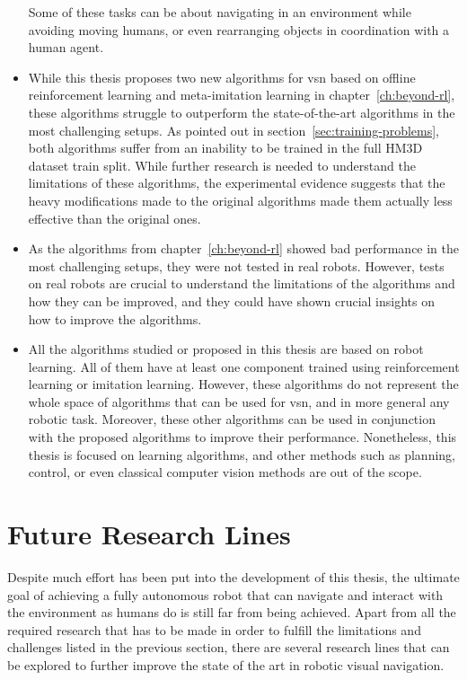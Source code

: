 \begin{itemize}
    Some of these tasks can be about navigating in an environment while avoiding moving humans, or even rearranging objects in coordination with a human agent.
    \item While this thesis proposes two new algorithms for \acrshort{vsn} based on offline reinforcement learning and meta-imitation learning in chapter~\ref{ch:beyond-rl}, these algorithms struggle to outperform the state-of-the-art algorithms in the most challenging setups.
    As pointed out in section~\ref{sec:training-problems}, both algorithms suffer from an inability to be trained in the full HM3D dataset train split.
    While further research is needed to understand the limitations of these algorithms, the experimental evidence suggests that the heavy modifications made to the original algorithms made them actually less effective than the original ones.
    \item As the algorithms from chapter~\ref{ch:beyond-rl} showed bad performance in the most challenging setups, they were not tested in real robots.
    However, tests on real robots are crucial to understand the limitations of the algorithms and how they can be improved, and they could have shown crucial insights on how to improve the algorithms.
    \item All the algorithms studied or proposed in this thesis are based on robot learning.
    All of them have at least one component trained using reinforcement learning or imitation learning.
    However, these algorithms do not represent the whole space of algorithms that can be used for \acrshort{vsn}, and in more general any robotic task.
    Moreover, these other algorithms can be used in conjunction with the proposed algorithms to improve their performance.
    Nonetheless, this thesis is focused on learning algorithms, and other methods such as planning, control, or even classical computer vision methods are out of the scope.
\end{itemize}

\section{Future Research Lines}\label{sec:future-work}

Despite much effort has been put into the development of this thesis, the ultimate goal of achieving a fully autonomous robot that can navigate and interact with the environment as humans do is still far from being achieved.
Apart from all the required research that has to be made in order to fulfill the limitations and challenges listed in the previous section, there are several research lines that can be explored to further improve the state of the art in robotic visual navigation.


